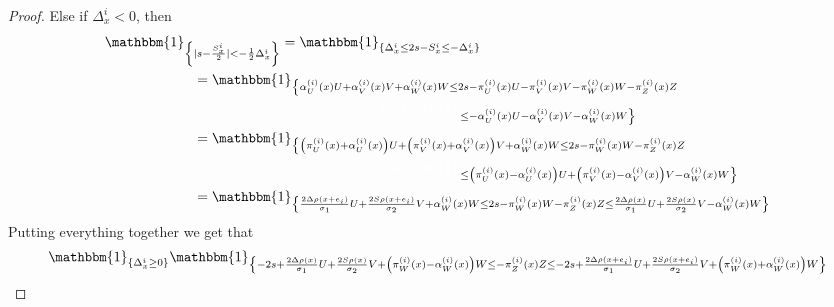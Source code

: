 \documentclass[12pt]{article}
\theoremstyle{Theorem}
\begin{document}
\begin{proof}
Else if $\Delta^{i}_{\scriptscriptstyle x} < 0$, then  
\begin{align*}
\mathbbm{1}_{\left\{ |s - \frac{S^{i}_{\scriptscriptstyle x}}{2}| < -\frac{1}{2}\Delta^{i}_ {\scriptscriptstyle x}\right\}} & =  \mathbbm{1}_{\left\{\Delta^{i}_ {\scriptscriptstyle x} \leq 2s - S^{i}_ {\scriptscriptstyle x} \leq -\Delta^{i}_ {\scriptscriptstyle x}\right\}} \\
& \hspace{-2.2cm} = \mathbbm{1}_{\left\{ \alpha^{\scriptscriptstyle(i)}_{U}(x)U +  \alpha^{\scriptscriptstyle(i)}_{V}(x) V +  \alpha^{\scriptscriptstyle(i)}_{W}(x) W \leq 2s -  \pi^{\scriptscriptstyle(i)}_{U}(x)U -  \pi^{\scriptscriptstyle(i)}_{V}(x) V -  \pi^{\scriptscriptstyle(i)}_{W}(x) W -  \pi^{\scriptscriptstyle(i)}_{Z}(x)Z \right.} \\
& \phantom{=} \hspace{2.2cm} \textcolor{white}{\mathbbm{1}}_{\left.\leq  - \alpha^{\scriptscriptstyle(i)}_{U}(x)U -  \alpha^{\scriptscriptstyle(i)}_{V}(x) V -  \alpha^{\scriptscriptstyle(i)}_{W}(x) W \right\}} \\
& \hspace{-2.2cm}  = \mathbbm{1}_{\left\{ \left( \pi^{\scriptscriptstyle(i)}_{U}(x) + \alpha^{\scriptscriptstyle(i)}_{U}(x)\right) U + \left( \pi^{\scriptscriptstyle(i)}_{V}(x) +  \alpha^{\scriptscriptstyle(i)}_{V}(x) \right) V +  \alpha^{\scriptscriptstyle(i)}_{W}(x) W \leq 2s -  \pi^{\scriptscriptstyle(i)}_{W}(x) W -  \pi^{\scriptscriptstyle(i)}_{Z}(x)Z \right.} \\
& \phantom{=} \hspace{2.2cm} \textcolor{white}{\mathbbm{1}}_{\left.\leq \left( \pi^{\scriptscriptstyle(i)}_{U}(x) -  \alpha^{\scriptscriptstyle(i)}_{U}(x)\right) U + \left( \pi^{\scriptscriptstyle(i)}_{V}(x) -  \alpha^{\scriptscriptstyle(i)}_{V}(x) \right) V -  \alpha^{\scriptscriptstyle(i)}_{W}(x) W \right\}} \\ 
& \hspace{-2.2cm} = \mathbbm{1}_{\left\{\frac{2\Delta \rho(x+e_i) }{\sigma_1} U + \frac{2S\rho(x+e_i)}{\sigma_{2}}V + \alpha^{\scriptscriptstyle(i)}_{W}(x) W \leq 2s - \pi^{\scriptscriptstyle(i)}_{W}(x) W - \pi^{\scriptscriptstyle(i)}_{Z}(x) Z \leq \frac{2\Delta \rho(x)}{\sigma_1}U + \frac{2S \rho(x)}{\sigma_{2}}V -  \alpha^{\scriptscriptstyle(i)}_{W}(x) W\right\}}
\end{align*}
Putting everything together we get that 
{\tiny
\begin{align*}
\mathbbm{1}_{\left\{\Delta^{i}_{\scriptscriptstyle x} \geq 0\right\}}\mathbbm{1}_{ \left\{-2s + \frac{2\Delta \rho(x)}{\sigma_1} U + \frac{2S \rho(x)}{\sigma_{2}}V + \left( \pi^{\scriptscriptstyle(i)}_{W}(x) -  \alpha^{\scriptscriptstyle(i)}_{W}(x)\right) W \leq  -  \pi^{\scriptscriptstyle(i)}_{Z}(x)Z \leq -2s + \frac{2\Delta \rho(x+e_i) }{\sigma_1}U + \frac{2S \rho(x+e_i)}{\sigma_{2}}V + \left( \pi^{\scriptscriptstyle(i)}_{W}(x) +  \alpha^{\scriptscriptstyle(i)}_{W}(x)\right) W\right\}} \\

\end{align*}}
\end{proof}
\end{document}

